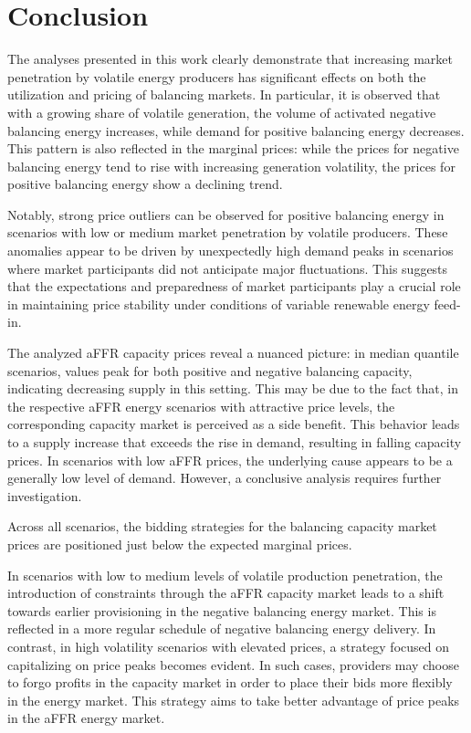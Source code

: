 \chapter{Conclusion}


The analyses presented in this work clearly demonstrate that increasing market penetration by volatile energy producers
has significant effects on both the utilization and pricing of balancing markets. In particular,
it is observed that with a growing share of volatile generation, the volume of activated negative balancing energy increases,
while demand for positive balancing energy decreases. This pattern is also reflected in the marginal prices: while the prices
for negative balancing energy tend to rise with increasing generation volatility, the prices for positive balancing energy show
a declining trend.

Notably, strong price outliers can be observed for positive balancing energy in scenarios with low or medium market penetration
by volatile producers. These anomalies appear to be driven by unexpectedly high demand peaks in scenarios where market participants
did not anticipate major fluctuations. This suggests that the expectations and preparedness of market participants play a crucial
role in maintaining price stability under conditions of variable renewable energy feed-in.

The analyzed aFFR capacity prices reveal a nuanced picture: in median quantile scenarios, values peak for both positive and negative balancing capacity,
indicating decreasing supply in this setting.
This may be due to the fact that, in the respective aFFR energy scenarios
with attractive price levels, the corresponding capacity market
is perceived as a side benefit.
This behavior leads to a supply increase that exceeds the rise in demand, resulting in falling capacity prices.
In scenarios with low aFFR prices, the underlying cause appears
to be a generally low level of demand.
However, a conclusive analysis requires further investigation.

Across all scenarios, the bidding strategies for the balancing capacity market prices are positioned just below the expected marginal prices.

In scenarios with low to medium levels of volatile production penetration,
the introduction of constraints through the aFFR capacity market leads to a shift
towards earlier provisioning in the negative balancing energy market. This is reflected in a more regular schedule of negative balancing energy delivery. In contrast, in high volatility
scenarios with elevated prices, a strategy focused on capitalizing on price peaks becomes evident. In such cases, providers may choose to forgo profits
in the capacity market in order to place their bids more flexibly in the energy market.
This strategy aims to take better advantage of price peaks in the aFFR energy market.

